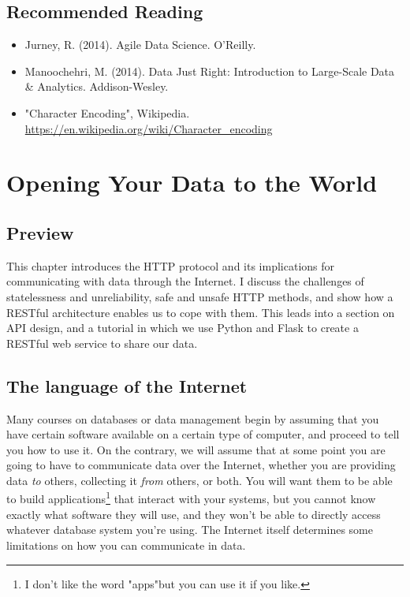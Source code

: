 \documentclass[11pt]{book}
\begin{document}
\section*{Recommended Reading}
\begin{itemize}
    \item Jurney, R. (2014).  Agile Data Science.  O'Reilly.
    \item Manoochehri, M. (2014). Data Just Right: Introduction to Large-Scale Data \& Analytics. Addison-Wesley.
    \item "Character Encoding", Wikipedia. \url{https://en.wikipedia.org/wiki/Character_encoding}
\end{itemize}















\chapter{Opening Your Data to the World}\label{ch:apis}

\section*{Preview}

This chapter introduces the HTTP protocol and its implications for communicating with data through the Internet.  I discuss the challenges of statelessness and unreliability, safe and unsafe HTTP methods, and show how a RESTful architecture enables us to cope with them.  This leads into a section on API design, and a tutorial in which we use Python and Flask to create a RESTful web service to share our data.

\section{The language of the Internet}

Many courses on databases or data management begin by assuming that you have certain software available on a certain type of computer, and proceed to tell you how to use it.  On the contrary, we will assume that at some point you are going to have to communicate data over the Internet, whether you are providing data \emph{to} others, collecting it \emph{from} others, or both.  You will want them to be able to build applications\footnote{I don't like the word "apps"but you can use it if you like.} that interact with your systems, but you cannot know exactly what software they will use, and they won't be able to directly access whatever database system you're using.  The Internet itself determines some limitations on how you can communicate in data.
\end{document}
